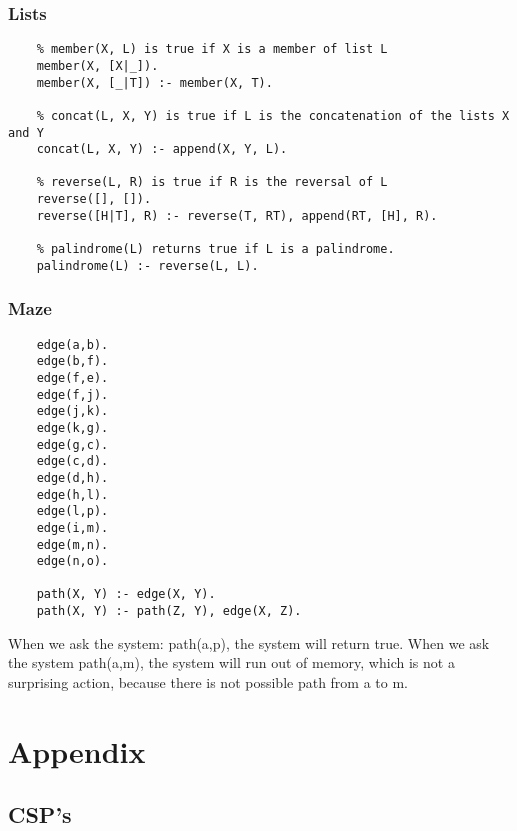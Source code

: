 \documentclass{article}
\begin{document}
	\subsubsection*{Lists}
	\begin{lstlisting}
	% member(X, L) is true if X is a member of list L
	member(X, [X|_]).
	member(X, [_|T]) :- member(X, T).
	
	% concat(L, X, Y) is true if L is the concatenation of the lists X and Y
	concat(L, X, Y) :- append(X, Y, L).
	
	% reverse(L, R) is true if R is the reversal of L
	reverse([], []).
	reverse([H|T], R) :- reverse(T, RT), append(RT, [H], R).
	
	% palindrome(L) returns true if L is a palindrome.
	palindrome(L) :- reverse(L, L).
	\end{lstlisting}
	\subsubsection*{Maze}
	\begin{lstlisting}	
	edge(a,b).
	edge(b,f).
	edge(f,e).
	edge(f,j).
	edge(j,k).
	edge(k,g).
	edge(g,c).
	edge(c,d).
	edge(d,h).
	edge(h,l).
	edge(l,p).
	edge(i,m).
	edge(m,n).
	edge(n,o).
	
	path(X, Y) :- edge(X, Y).
	path(X, Y) :- path(Z, Y), edge(X, Z).
	\end{lstlisting}
	When we ask the system: path(a,p), the system will return true. When we ask the system path(a,m), the system will run out of memory, which is not a surprising action, because there is not possible path from a to m.
	\section{Appendix}
	\subsection*{CSP's}
	
\end{document}
